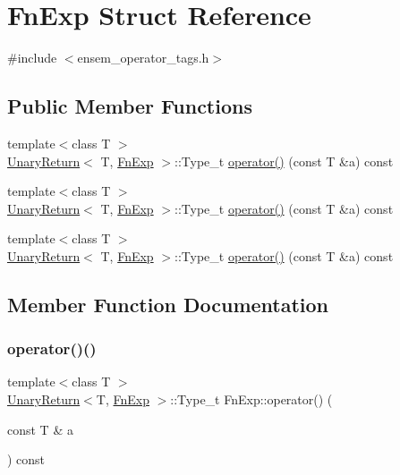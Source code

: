 \hypertarget{structFnExp}{}\section{Fn\+Exp Struct Reference}
\label{structFnExp}


{\ttfamily \#include $<$ensem\+\_\+operator\+\_\+tags.\+h$>$}

\subsection*{Public Member Functions}
\begin{DoxyCompactItemize}
\item 
{\footnotesize template$<$class T $>$ }\\\mbox{\hyperlink{structUnaryReturn}{Unary\+Return}}$<$ T, \mbox{\hyperlink{structFnExp}{Fn\+Exp}} $>$\+::Type\+\_\+t \mbox{\hyperlink{structFnExp_a42b9ce4950a3772fe907b8da3497267e}{operator()}} (const T \&a) const
\item 
{\footnotesize template$<$class T $>$ }\\\mbox{\hyperlink{structUnaryReturn}{Unary\+Return}}$<$ T, \mbox{\hyperlink{structFnExp}{Fn\+Exp}} $>$\+::Type\+\_\+t \mbox{\hyperlink{structFnExp_a42b9ce4950a3772fe907b8da3497267e}{operator()}} (const T \&a) const
\item 
{\footnotesize template$<$class T $>$ }\\\mbox{\hyperlink{structUnaryReturn}{Unary\+Return}}$<$ T, \mbox{\hyperlink{structFnExp}{Fn\+Exp}} $>$\+::Type\+\_\+t \mbox{\hyperlink{structFnExp_a42b9ce4950a3772fe907b8da3497267e}{operator()}} (const T \&a) const
\end{DoxyCompactItemize}


\subsection{Member Function Documentation}
\mbox{\label{structFnExp_a42b9ce4950a3772fe907b8da3497267e}} 
\subsubsection{\texorpdfstring{operator()()}{operator()()}\hspace{0.1cm}{\footnotesize\ttfamily [1/3]}}
{\footnotesize\ttfamily template$<$class T $>$ \\
\mbox{\hyperlink{structUnaryReturn}{Unary\+Return}}$<$T, \mbox{\hyperlink{structFnExp}{Fn\+Exp}} $>$\+::Type\+\_\+t Fn\+Exp\+::operator() (\begin{DoxyParamCaption}\item[{const T \&}]{a }\end{DoxyParamCaption}) const\hspace{0.3cm}{\ttfamily [inline]}}

